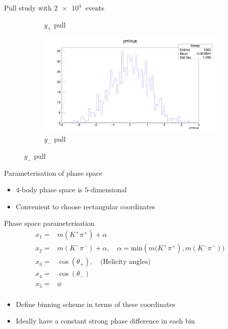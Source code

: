 \documentclass{beamer}
\begin{document}
\begin{frame}{Pull study with $\SI{2e4}{}$ events}
\begin{figure}
\begin{subfigure}{0.5\textwidth}
      \caption{$y_+$ pull}
    \end{subfigure}%
    \begin{subfigure}{0.5\textwidth}
      \includegraphics[width = 1.0\textwidth]{yminus10K1K.png}
      \caption{$y_-$ pull}
    \end{subfigure}
  \end{figure}
\end{frame}

\begin{frame}{Parameterisation of phase space}
  \begin{itemize}
    \item{$4$-body phase space is $5$-dimensional}
    \item{Convenient to choose rectangular coordinates}
  \end{itemize}
  \begin{block}{Phase space parameterisation}
    \begin{align*}
      x_1 =& m(K^+\pi^+) + \alpha \\
      x_2 =& m(K^-\pi^-) + \alpha, \quad \alpha = \text{min}(m\big(K^+\pi^+), m(K^-\pi^-)\big) \\
      x_3 =& \cos(\theta_+), \quad \text{(Helicity angles)} \\
      x_4 =& \cos(\theta_-) \\
      x_5 =& \phi \\
    \end{align*}
  \end{block}
  \begin{itemize}
    \item{Define binning scheme in terms of these coordinates}
    \item{Ideally have a constant strong phase difference in each bin}
  \end{itemize}
\end{frame}
\end{document}
